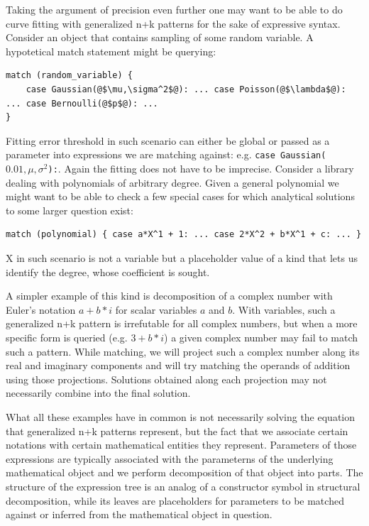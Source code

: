\documentclass[preprint]{sigplanconf}
\makeatletter
\DeclareRobustCommand{\code}[1]{{\lstinline[breaklines=false,escapechar=@]{#1}}}
\makeatother
\begin{document}
Taking the argument of precision even further one may want to be able to do 
curve fitting with generalized n+k patterns for the sake of expressive syntax. 
Consider an object that contains sampling of some random variable. A hypotetical 
match statement might be querying:

\begin{lstlisting}[keepspaces,columns=flexible]
match (random_variable) { 
    case Gaussian(@$\mu,\sigma^2$@): ... case Poisson(@$\lambda$@): ... case Bernoulli(@$p$@): ... 
}
\end{lstlisting} 

Fitting error threshold in such scenario can either be global or passed 
as a parameter into expressions we are matching against: e.g. 
\code{case Gaussian(}$0.01,\mu,\sigma^2$\code{):}.
Again the fitting does not have to be imprecise. Consider a library dealing with 
polynomials of arbitrary degree. Given a general polynomial we might want to be 
able to check a few special cases for which analytical solutions to some larger 
question exist:

\begin{lstlisting}[keepspaces,columns=flexible]
match (polynomial) { case a*X^1 + 1: ... case 2*X^2 + b*X^1 + c: ... }
\end{lstlisting} 

X in such scenario is not a variable but a placeholder value of a kind that lets 
us identify the degree, whose coefficient is sought. 

A simpler example of this kind is decomposition of a complex number with Euler's 
notation $a+b*i$ for scalar variables $a$ and $b$. With variables, such a 
generalized n+k pattern is irrefutable for all complex numbers, but when a more 
specific form is queried (e.g. $3+b*i$) a given complex number may fail to match 
such a pattern. While matching, we will project such a complex number along its 
real and imaginary components and will try matching the operands of addition 
using those projections. Solutions obtained along each projection may not 
necessarily combine into the final solution.

What all these examples have in common is not necessarily solving the equation 
that generalized n+k patterns represent, but the fact that we associate certain 
notations with certain mathematical entities they represent. Parameters of 
those expressions are typically associated with the parameterns of the 
underlying mathematical object and we perform decomposition of that object into 
parts. The structure of the expression tree is an analog of a constructor symbol in 
structural decomposition, while its leaves are placeholders for parameters to be 
matched against or inferred from the mathematical object in question.
\end{document}

